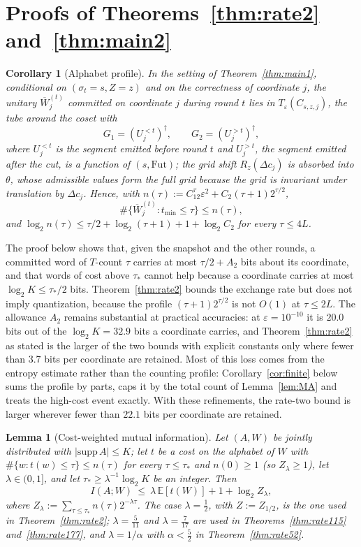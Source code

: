 \documentclass[aps,prx,twocolumn,superscriptaddress,nofootinbib,longbibliography]{revtex4-2}
\theoremstyle{plain}
\newtheorem{lemma}{Lemma}
\newtheorem{corollary}{Corollary}
\theoremstyle{definition}
\theoremstyle{remark}
\newcommand{\E}{\mathbb{E}}
\begin{document}
\section{Proofs of Theorems~\ref{thm:rate2} and~\ref{thm:main2}}\label{app:rate}

\begin{corollary}[Alphabet profile]\label{cor:profile}
In the setting of Theorem~\ref{thm:main1}, conditional on $(\sigma_t=s,Z=z)$ and on the correctness of coordinate $j$, the unitary $\overline W^{(t)}_j$ committed on coordinate $j$ during round $t$ lies in $T_\varepsilon(C_{s,z,j})$, the tube around the coset with
\[G_1=(U^{<t}_j)^\dagger,\qquad G_2=(U^{>t}_j)^\dagger,\]
where $U^{<t}_j$ is the segment emitted before round $t$ and $U^{>t}_j$, the segment emitted after the cut, is a function of $(s,\mathrm{Fut})$; the grid shift $R_z(\Delta c_j)$ is absorbed into $\theta$, whose admissible values form the full grid because the grid is invariant under translation by $\Delta c_j$. Hence, with $n(\tau):=C_12^\tau\varepsilon^2+C_2(\tau+1)2^{\tau/2}$,
\[\#\{\overline W^{(t)}_j:t_{\min}\le\tau\}\le n(\tau),\]
and $\log_2n(\tau)\le\tau/2+\log_2(\tau+1)+1+\log_2C_2$ for every $\tau\le4L$.
\end{corollary}
The proof below shows that, given the snapshot and the other rounds, a committed word of $T$-count $\tau$ carries at most $\tau/2+A_2$ bits about its coordinate, and that words of cost above $\tau_*$ cannot help because a coordinate carries at most $\log_2K\le\tau_*/2$ bits. Theorem~\ref{thm:rate2} bounds the exchange rate but does not imply quantization, because the profile $(\tau+1)2^{\tau/2}$ is not $O(1)$ at $\tau\le2L$. The allowance $A_2$ remains substantial at practical accuracies: at $\varepsilon=10^{-10}$ it is $20.0$ bits out of the $\log_2K=32.9$ bits a coordinate carries, and Theorem~\ref{thm:rate2} as stated is the larger of the two bounds with explicit constants only where fewer than $3.7$ bits per coordinate are retained. Most of this loss comes from the entropy estimate rather than the counting profile: Corollary~\ref{cor:finite} below sums the profile by parts, caps it by the total count of Lemma~\ref{lem:MA} and treats the high-cost event exactly. With these refinements, the rate-two bound is larger wherever fewer than $22.1$ bits per coordinate are retained.
\begin{lemma}[Cost-weighted mutual information]\label{lem:gibbs}
Let $(A,W)$ be jointly distributed with $|\mathrm{supp}\,A|\le K$; let $t$ be a cost on the alphabet of $W$ with $\#\{w:t(w)\le\tau\}\le n(\tau)$ for every $\tau\le\tau_*$ and $n(0)\ge1$ (so $Z_\lambda\ge1$), let $\lambda\in(0,1]$, and let $\tau_*\ge\lambda^{-1}\log_2K$ be an integer. Then
\begin{equation}
I(A;W)\ \le\ \lambda\,\E[t(W)]+1+\log_2Z_\lambda,
\end{equation}
where $Z_\lambda:=\sum_{\tau\le\tau_*}n(\tau)2^{-\lambda\tau}$. The case $\lambda=\tfrac12$, with $Z:=Z_{1/2}$, is the one used in Theorem~\ref{thm:rate2}; $\lambda=\tfrac5{11}$ and $\lambda=\tfrac7{17}$ are used in Theorems~\ref{thm:rate115} and~\ref{thm:rate177}, and $\lambda=1/\alpha$ with $\alpha<\tfrac52$ in Theorem~\ref{thm:rate52}.
\end{lemma}
\end{document}
